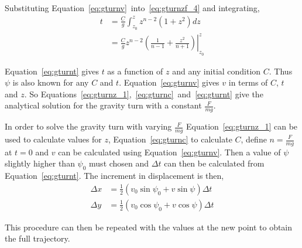 Substituting Equation~\eqref{eq:gturnv}~into~\eqref{eq:gturnzf_4} and integrating,
\begin{align}
    t&=\frac{C}{g}\int_{z_0}^z z^{n-2} \left(1+ z^2\right) dz \nonumber\\
     &=\frac{C}{g}z^{n-2} \left. \left(\frac{1}{n-1}+\frac{z^2}{n+1}\right) \right |_{z_0}^z \label{eq:gturnt}
\end{align}

Equation~\eqref{eq:gturnt} gives $t$ as a function of $z$ and any initial condition $C$. Thus $\psi$ is also known for any $C$ and $t$. Equation~\eqref{eq:gturnv} gives $v$ in terms of $C$, $t$ and $z$. So Equations~\eqref{eq:gturnz_1},~\eqref{eq:gturnc}~and~\eqref{eq:gturnt} give the analytical solution for the gravity turn with a constant $\frac{F}{mg}$.

In order to solve the gravity turn with varying $\frac{F}{mg}$ Equation~\eqref{eq:gturnz_1} can be used to calculate values for $z$, Equation~\eqref{eq:gturnc} to calculate $C$, define $n=\frac{F}{mg}$ at $t=0$ and $v$ can be calculated using Equation~\eqref{eq:gturnv}. Then a value of $\psi$ slightly higher than $\psi_0$ must chosen and $\Delta t$ can then be calculated from Equation~\eqref{eq:gturnt}. The increment in displacement is then,
\begin{align}
    \Delta x &= \frac{1}{2}\left(v_0 \sin{\psi_0} +v \sin \psi \right) \Delta t \\
    \Delta y &= \frac{1}{2}\left(v_0 \cos{\psi_0} +v \cos \psi \right) \Delta t 
\end{align}

This procedure can then be repeated with the values at the new point to obtain the full trajectory.



